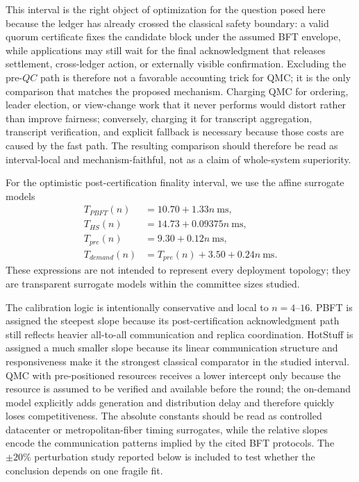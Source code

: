 \documentclass{ieeeaccess}
\begin{document}
This interval is the right object of optimization for the question posed here because the ledger has already crossed the classical safety boundary: a valid quorum certificate fixes the candidate block under the assumed BFT envelope, while applications may still wait for the final acknowledgment that releases settlement, cross-ledger action, or externally visible confirmation. Excluding the pre-$QC$ path is therefore not a favorable accounting trick for QMC; it is the only comparison that matches the proposed mechanism. Charging QMC for ordering, leader election, or view-change work that it never performs would distort rather than improve fairness; conversely, charging it for transcript aggregation, transcript verification, and explicit fallback is necessary because those costs are caused by the fast path. The resulting comparison should therefore be read as interval-local and mechanism-faithful, not as a claim of whole-system superiority.

For the optimistic post-certification finality interval, we use the affine surrogate models
\begin{align}
T_{PBFT}(n) &= 10.70 + 1.33n\ \text{ms}, \label{eq:tpbft}\\
T_{HS}(n) &= 14.73 + 0.09375n\ \text{ms}, \label{eq:ths}\\
T_{pre}(n) &= 9.30 + 0.12n\ \text{ms}, \label{eq:tpre}\\
T_{demand}(n) &= T_{pre}(n) + 3.50 + 0.24n\ \text{ms}. \label{eq:tdemand}
\end{align}
These expressions are not intended to represent every deployment topology; they are transparent surrogate models within the committee sizes studied.

The calibration logic is intentionally conservative and local to $n=4$--$16$. PBFT is assigned the steepest slope because its post-certification acknowledgment path still reflects heavier all-to-all communication and replica coordination. HotStuff is assigned a much smaller slope because its linear communication structure and responsiveness make it the strongest classical comparator in the studied interval. QMC with pre-positioned resources receives a lower intercept only because the resource is assumed to be verified and available before the round; the on-demand model explicitly adds generation and distribution delay and therefore quickly loses competitiveness. The absolute constants should be read as controlled datacenter or metropolitan-fiber timing surrogates, while the relative slopes encode the communication patterns implied by the cited BFT protocols. The $\pm20\%$ perturbation study reported below is included to test whether the conclusion depends on one fragile fit.
\end{document}
